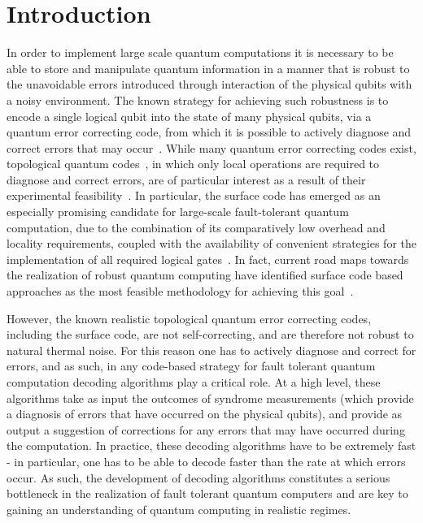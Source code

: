 \documentclass[twocolumn,preprintnumbers,amsmath,amssymb,notitlepage,nofootinbib,longbibliography,superscriptaddress,aps,pra,10pt]{revtex4-1}
\begin{document}
\section{Introduction}\label{s:introduction}
	In order to implement large scale quantum computations it is necessary to be able to store and manipulate quantum information in a manner that is robust to the unavoidable errors introduced through interaction of the physical qubits with a noisy environment.
	The known strategy for achieving such robustness is to encode a single logical qubit into the state of many physical qubits, via a quantum error correcting code, from which it is possible to actively diagnose and correct errors that may occur~\cite{Terhal15,Campbell17}.
	While many quantum error correcting codes exist, topological quantum codes~\cite{Kitaev03, Dennis02, Preskill17lectures, Nayak08, Pachos12, Terhal15, Brown16, Campbell17}, in which only local operations are required to diagnose and correct errors, are of particular interest as a result of their experimental feasibility~\cite{Reed12, Barends14, Nigg14, Corcoles15, Albrecht16, Takita16, Linke17}.
	In particular, the surface code has emerged as an especially promising candidate for large-scale fault-tolerant quantum computation, due to the combination of its comparatively low overhead and locality requirements, coupled with the availability of convenient strategies for the implementation of all required logical gates~\cite{Fowler18,Litinski18b}.
	In fact, current road maps towards the realization of robust quantum computing have identified surface code based approaches as the most feasible methodology for achieving this goal~\cite{Roadmap}.

	However, the known realistic topological quantum error correcting codes, including the surface code, are not self-correcting, and are therefore not robust to natural thermal noise.
	For this reason one has to actively diagnose and correct for errors, and as such, in any code-based strategy for fault tolerant quantum computation decoding algorithms play a critical role.
	At a high level, these algorithms take as input the outcomes of syndrome measurements (which provide a diagnosis of errors that have occurred on the physical qubits), and provide as output a suggestion of corrections for any errors that may have occurred during the computation.
	In practice, these decoding algorithms have to be extremely fast - in particular, one has to be able to decode faster than the rate at which errors occur.
	As such, the development of decoding algorithms constitutes a serious bottleneck in the realization of fault tolerant quantum computers and are key to gaining an understanding of quantum computing in realistic regimes.
\end{document}
